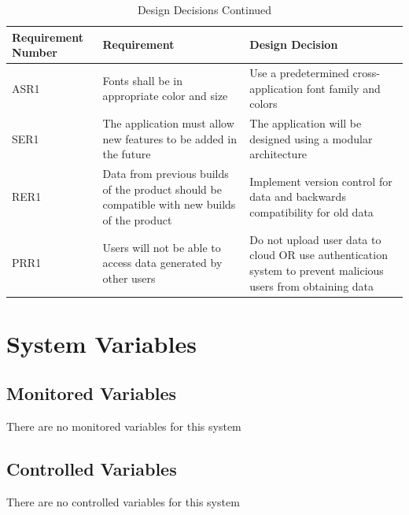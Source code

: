 \documentclass[12pt, titlepage]{article}
\begin{document}
\begin{table}[h]
\caption{Design Decisions Continued} \label{TblDecisions}
\begin{tabularx}{\textwidth}{p{2.5cm}p{6cm}X}
\toprule
\textbf{Requirement Number} & \textbf{Requirement} & \textbf{Design Decision}\\
\midrule
ASR1& Fonts shall be in appropriate color and size & Use a predetermined cross-application font family and colors\\
\midrule
SER1 & The application must allow new features to be added in the future &
The application will be designed using a modular architecture\\
\midrule
RER1 & Data from previous builds of the product should be compatible with new builds of the product & Implement version control for data and backwards compatibility for old data\\
\midrule
PRR1 & Users will not be able to access data generated by other users & Do not upload user data to cloud OR use authentication system to prevent malicious users from obtaining data\\

\bottomrule
\end{tabularx}
\end{table}


\section{System Variables}
\subsection{Monitored Variables}
There are no monitored variables for this system

\subsection{Controlled Variables}
There are no controlled variables for this system
\end{document}
